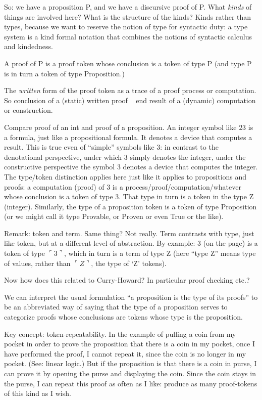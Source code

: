 So: we have a proposition P, and we have a discursive proof of P.
What \textit{kinds} of things are involved here?  What is the
structure of the kinds?  Kinds rather than types, because we want to
reserve the notion of type for syntactic duty: a type system is a kind
formal notation that combines the notions of syntactic calculus and
kindedness.

A proof of P is a proof token whose conclusion is a token of type P
(and type P is in turn a token of type Proposition.)

The \textit{written} form of the proof token as a trace of a proof
process or computation.  So conclusion of a (static) written proof ~
end result of a (dynamic) computation or construction.

Compare proof of an int and proof of a proposition.  An integer symbol
like \(23\) is a formula, just like a propositional formula.  It
denotes a device that computes a result.  This is true even of
``simple'' symbols like \(3\): in contrast to the denotational
perspective, under which \(3\) simply denotes the integer, under the
constructive perspective the symbol \(3\) denotes a device that
computes the integer.  The type/token distinction applies here just
like it applies to propositions and proofs: a computation (proof) of
\(3\) is a process/proof/computation/whatever whose conclusion is a
token of type 3.  That type in turn is a token in the type Z
(integer).  Similarly, the type of a proposition token is a token of
type Proposition (or we might call it type Provable, or Proven or even
True or the like).

Remark: token and term.  Same thing?  Not really.  Term contrasts with
type, just like token, but at a different level of abstraction.  By
example: 3 (on the page) is a token of type \(\ulcorner\)3\(\urcorner\),
which in turn is a term of type Z (here ``type Z'' means type of
values, rather than \(\ulcorner Z\urcorner\), the type of `Z' tokens).

Now how does this related to Curry-Howard?  In particular proof checking etc.?

We can interpret the usual formulation \enquote{a proposition is the
  type of its proofs} to be an abbreviated way of saying that the type
of a proposition serves to categorize proofs whose conclusions are
tokens whose type is the proposition.

Key concept: token-repeatability.  In the example of pulling a coin
from my pocket in order to prove the proposition that there is a coin
in my pocket, once I have performed the proof, I cannot repeat it,
since the coin is no longer in my pocket. (See: linear logic.)  But if
the proposition is that there is a coin in purse, I can prove it by
opening the purse and displaying the coin.  Since the coin stays in
the purse, I can repeat this proof as often as I like: produce as many
proof-tokens of this kind as I wish.

